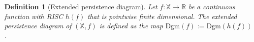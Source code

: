 \documentclass[11pt]{article}
\newtheorem{definition}[theorem]{Definition}
\theoremstyle{remark}
\newcommand{\R}{\mathbb{R}}
\newcommand{\X}{\mathbb{X}}
\begin{document}
\begin{definition}[Extended persistence diagram]
Let $f:\X\rightarrow\R$ be a continuous function with RISC $h(f)$ that is pointwise finite dimensional. The \emph{extended persistence diagram} of $(\X,f)$ is defined as the map $\mathrm{Dgm}(f):=\mathrm{Dgm}(h(f))$.
\end{definition}

\begin{figure}
    \centering
    
    




\begin{tikzpicture}[x=0.75pt,y=0.75pt,yscale=-1,xscale=1]


\end{tikzpicture}
\end{figure}
\end{document}
